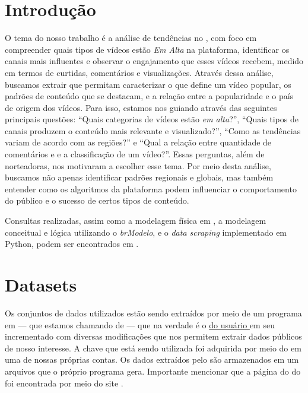 \chapter{Introdução}

  O tema do nosso trabalho é a análise de tendências no , com foco em compreender quais tipos de vídeos estão \emph{Em Alta} na plataforma, identificar os canais mais influentes e observar o engajamento que esses vídeos recebem, medido em termos de curtidas, comentários e visualizações. Através dessa análise, buscamos extrair  que permitam caracterizar o que define um vídeo popular, os padrões de conteúdo que se destacam, e a relação entre a popularidade e o país de origem dos vídeos. Para isso, estamos nos guiando através das seguintes principais questões: ``Quais categorias de vídeos estão \emph{em alta}?'', ``Quais tipos de canais produzem o conteúdo mais relevante e visualizado?'', ``Como as tendências variam de acordo com as regiões?'' e ``Qual a relação entre quantidade de comentários e  e a classificação de um vídeo?''. Essas perguntas, além de norteadoras, nos motivaram a escolher esse tema. Por meio desta análise, buscamos não apenas identificar padrões regionais e globais, mas também entender como os algoritmos da plataforma podem influenciar o comportamento do público e o sucesso de certos tipos de conteúdo.

  Consultas realizadas, assim como a modelagem física em , a modelagem conceitual e lógica utilizando o \textit{brModelo}, e o \textit{data scraping} implementado em Python, podem ser encontrados em \cite{our-YoutubeScraperDataBank}.

\chapter{Datasets}

  Os conjuntos de dados utilizados estão sendo extraídos por meio de um programa em  --- que estamos chamando de  --- que na verdade é o \href{https://github.com/mitchelljy/Trending-YouTube-Scraper}{ do usuário } em seu \href{https://github.com/mitchelljy}{} incrementado com diversas modificações que nos permitem extrair dados públicos de nosso interesse. A chave \href{https://developers.google.com/youtube/v3/docs?hl=pt-br}{} que está sendo utilizada foi adquirida por meio do  em uma de nossas próprias contas. Os dados extraídos pelo  são armazenados em um arquivos  que o próprio programa gera. Importante mencionar que a página do  do  foi encontrada por meio do site \cite{kaggle}.


